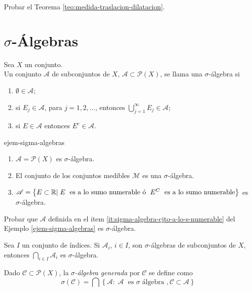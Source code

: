 \begin{ejercicio}{}
Probar el Teorema \ref{teo:medida-traslacion-dilatacion}.
\end{ejercicio}

\section{$\sigma$-\'Algebras}

\begin{definicion}{}
Sea $X$ un conjunto. 
\\
Un conjunto $\mathscr{A}$ de subconjuntos de $X$, 
$\mathscr{A}\subset \mathscr{P}(X)$, se llama una $\sigma$-\'algebra si \begin{enumerate}
    \item $\emptyset \in \mathscr{A}$;
    \item si $E_j\in \mathscr{A}$, para $j=1,2,\ldots$, entonces
    $\bigcup\limits_{j=1}^{\infty} E_j \in \mathscr{A}$;
    \item si $E\in \mathscr{A}$ entonces $E^c \in \mathscr{A}$.
\end{enumerate}
\end{definicion}


\begin{ejemplo}{ejem-sigma-algebras}
\begin{enumerate}
    \item $\mathscr{A}=\mathscr{P}(X)$ es $\sigma$-\'algebra.
    \item El conjunto de los conjuntos medibles $\mathscr{M}$ es una $\sigma$-\'algebra.
    \item\label{it:sigma-algebra-cjto-a-lo-s-numerable} $\mathscr{A}=\left\{E\subset \mathbb{R}| \;E \;\mbox{ es a lo sumo numerable \'o } \; E^C \;\mbox{ es a lo sumo numerable}  \right\}$
    es $\sigma$-\'algebra.
\end{enumerate}
\end{ejemplo}


\begin{ejercicio}{}
Probar que  $\mathscr{A}$ definida en el item \ref{it:sigma-algebra-cjto-a-lo-s-numerable} del Ejemplo \ref{ejem-sigma-algebras} es $\sigma$-\'algebra.
\end{ejercicio}

Sea  $I$ un conjunto de \'indices.
Si $\mathscr{A}_i$, $i \in I$,  son $\sigma$-\'algebras de subconjuntos de $X$, entonces $\bigcap\limits_{i \in I} \mathscr{A}_i$ es $\sigma$-\'algebra. 

Dado $\mathscr{C}\subset \mathscr{P}(X)$, la \emph{$\sigma$-\'algebra
generada} por $\mathscr{C}$ se define como
\[\sigma(\mathscr{C})=\bigcap\left\{\mathscr{A}:\;\mathscr{A}\;\mbox{ es $\sigma$ \'algebra }, \mathscr{C} \subset \mathscr{A} \right \}
\]


